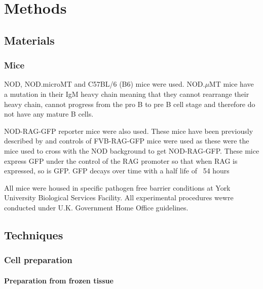 
\chapter{Methods}

\section{Materials}

\subsection{Mice}
\label{methods:mice}

NOD, NOD.microMT  and C57BL/6 (B6) mice were used.
NOD.$\mu$MT mice have a mutation in their IgM heavy chain meaning that they cannot rearrange their heavy chain, cannot progress from the pro B to pre B cell stage and therefore do not have any mature B cells.

NOD-RAG-GFP reporter mice were also used.
These mice have been previously described by  and controls of FVB-RAG-GFP mice were used as these were the mice used to cross with the NOD background to get NOD-RAG-GFP.
These mice express GFP under the control of the RAG promoter so that when RAG is expressed, so is GFP.
GFP decays over time with a half life of ~54 hours 

All mice were housed in specific pathogen free barrier conditions at York University Biological Services Facility. 
All experimental procedures wewre conducted under U.K. Government Home Office guidelines.



\section{Techniques}

\subsection{Cell preparation}

\subsubsection{Preparation from frozen tissue}

